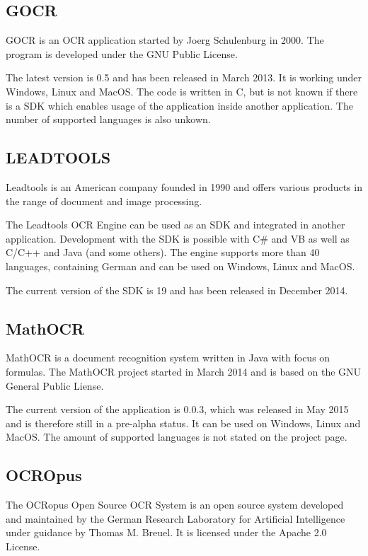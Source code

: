 \label{GOCR}
\subsection{GOCR}
GOCR is an OCR application started by Joerg Schulenburg in 2000. The program is developed under the GNU Public License.

The latest version is 0.5 and has been released in March 2013. It is working under Windows, Linux and MacOS. The code is written in C, but is not known if there is a SDK which enables usage of the application inside another application. The number of supported languages is also unkown.

\label{LEADTOOLS}
\subsection{LEADTOOLS}
Leadtools is an American company founded in 1990 and offers various products in the range of document and image processing. 

The Leadtools OCR Engine can be used as an SDK and integrated in another application. Development with the SDK is possible with C\# and VB as well as C/C++ and Java (and some others). The engine supports more than 40 languages, containing German and can be used on Windows, Linux and MacOS. 

The current version of the SDK is 19 and has been released in December 2014.

\label{MathOCR}
\subsection{MathOCR}
MathOCR is a document recognition system written in Java with focus on formulas. The MathOCR project started in March 2014 and is based on the GNU General Public Liense.

The current version of the application is 0.0.3, which was released in May 2015 and is therefore still in a pre-alpha status. It can be used on Windows, Linux and MacOS. The amount of supported languages is not stated on the project page.

\label{OCROpus}
\subsection{OCROpus}
The OCRopus Open Source OCR System is an open source system developed and maintained by the German Research Laboratory for Artificial Intelligence under guidance by Thomas M. Breuel. It is licensed under the Apache 2.0 License. 

